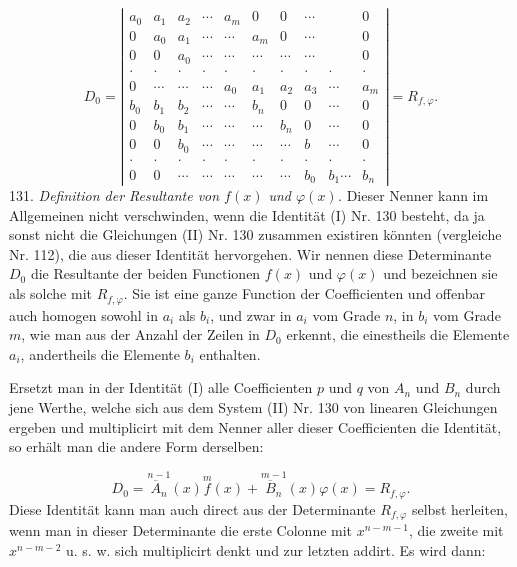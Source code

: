 \documentclass[11pt]{article}
\begin{document}
\[
D_0 = \left|
\begin{array}{cccccccccc}
a_0 & a_1 & a_2 & \cdots & a_m & 0 & 0 & \cdots & & 0\\
0 & a_0 & a_1 & \cdots & \cdots & a_m & 0 & \cdots & & 0\\
0 & 0 & a_0 & \cdots & \cdots & \cdots & \cdots & \cdots & & 0\\
\cdot & \cdot & \cdot & \cdot & \cdot & \cdot & \cdot & \cdot & \cdot & \cdot\\
0 & \cdots & \cdots & \cdots & a_0 & a_1 & a_2 & a_3 & \cdots & a_m\\
b_0 & b_1 & b_2 & \cdots & \cdots & b_n & 0 & 0 & \cdots & 0\\
0 & b_0 & b_1 & \cdots & \cdots & \cdots & b_n & 0 & \cdots & 0\\
0 & 0 & b_0 & \cdots & \cdots & \cdots & \cdots & b & \cdots & 0\\
\cdot & \cdot & \cdot & \cdot & \cdot & \cdot & \cdot & \cdot & \cdot & \cdot\\
0 & 0 & \cdots & \cdots & \cdots & \cdots & \cdots & b_0 & b_1 \cdots & b_n
\end{array}
\right| = R_{f,\varphi}.
\]
131. \textit{Definition der Resultante von $f(x)$ und $\varphi(x)$.} Dieser Nenner
kann im Allgemeinen nicht verschwinden, wenn die Identität (I) Nr. 130
besteht, da ja sonst nicht die Gleichungen (II) Nr. 130 zusammen
existiren könnten (vergleiche Nr. 112), die aus dieser Identität hervor\-gehen. Wir nennen diese Determinante $D_0$ \glqq die Resultante\grqq{} der beiden
Functionen $f(x)$ und $\varphi(x)$ und bezeichnen sie als solche mit $R_{f,\varphi}$.
Sie ist eine ganze Function der Coefficienten und offenbar auch homogen
sowohl in $a_i$ als $b_i$, und zwar in $a_i$ vom Grade $n$, in $b_i$ vom Grade $m$,
wie man aus der Anzahl der Zeilen in $D_0$ erkennt, die einestheils die
Elemente $a_i$, andertheils die Elemente $b_i$ enthalten.

Ersetzt man in der Identität (I) alle Coefficienten $p$ und $q$ von
$A_n$ und $B_n$ durch jene Werthe, welche sich aus dem System (II) Nr. 130
von linearen Gleichungen ergeben und multiplicirt mit dem Nenner
aller dieser Coefficienten die Identität, so erhält man die andere Form
derselben:

\[
D_0 = \overset{n-1}{\overline{A}_n}(x)\overset{m}{f}(x) + \overset{m-1}{\overline{B}_n}(x)\varphi(x) = R_{f,\varphi}.
\]
Diese Identität kann man auch direct aus der Determinante $R_{f,\varphi}$ selbst
herleiten, wenn man in dieser Determinante die erste Colonne mit
$x^{n-m-1}$, die zweite mit $x^{n-m-2}$ u. s. w. sich multiplicirt denkt und
zur letzten addirt. Es wird dann:
\end{document}
